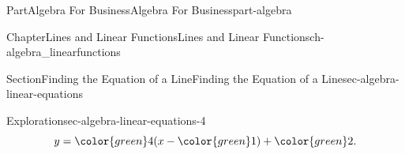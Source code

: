 \documentclass{tufte-book}
\numberwithin{equation}{chapter}
\begin{document}
\begin{partptx}{Part}{Algebra For Business}{}{Algebra For Business}{}{}{part-algebra}
\begin{chapterptx}{Chapter}{Lines and Linear Functions}{}{Lines and Linear Functions}{}{}{ch-algebra_linearfunctions}
\begin{sectionptx}{Section}{Finding the Equation of a Line}{}{Finding the Equation of a Line}{}{}{sec-algebra-linear-equations}
\begin{exploration}{Exploration}{}{sec-algebra-linear-equations-4}
\begin{equation*}
y = {\color{green} 4 } (x - {\color{green} 1} ) + {\color{green} 2}\text{.}
\end{equation*}
%
\begin{image}{0.25}{0.5}{0.25}{}%
\end{image}
\end{exploration}
\end{sectionptx}
\end{chapterptx}
\end{partptx}
\end{document}

